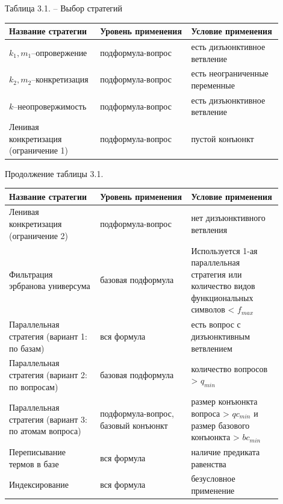 \begin{center}
Таблица 3.1. -- Выбор стратегий
\end{center}

\begin{longtable}[H]{|p{0.3\linewidth}|p{0.3\linewidth}|p{0.3\linewidth}|}
\hline
\textbf{Название стратегии} & \textbf{Уровень применения} & \textbf{Условие применения}\\
\hline
$k_1,m_1$--опровержение & подформула-вопрос & есть дизъюнктивное ветвление \\
\hline
$k_2,m_2$--конкретизация & подформула-вопрос & есть неограниченные переменные \\
\hline
$k$--неопровержимость & подформула-вопрос & есть дизъюнктивное ветвление \\
\hline
Ленивая конкретизация (ограничение 1) & подформула-вопрос & пустой конъюнкт \\
\hline
\end{longtable}

\newpage
\begin{center}
Продолжение таблицы 3.1. 
\end{center}

\begin{longtable}[H]{|p{0.3\linewidth}|p{0.3\linewidth}|p{0.3\linewidth}|}
\hline
\textbf{Название стратегии} & \textbf{Уровень применения} & \textbf{Условие применения}\\
\hline
Ленивая конкретизация (ограничение 2) & подформула-вопрос & нет дизъюнктивного ветвления \\
\hline
Фильтрация эрбранова универсума & базовая подформула & Используется 1-ая параллельная стратегия или количество видов функциональных символов < $f_{max}$ \\
\hline
Параллельная стратегия (вариант 1: по базам) & вся формула & есть вопрос с дизъюнктивным ветвлением \\
\hline
Параллельная стратегия (вариант 2: по вопросам) & базовая подформула & количество вопросов > $q_{min}$ \\
\hline
Параллельная стратегия (вариант 3: по атомам вопроса) & подформула-вопрос, базовый конъюнкт & размер конъюнкта вопроса > $qc_{min}$ и размер базового конъюнкта > $bc_{min}$  \\
\hline
Переписывание термов в базе & вся формула & наличие предиката равенства \\
\hline
Индексирование & вся формула & безусловное применение \\
\hline
\end{longtable}


